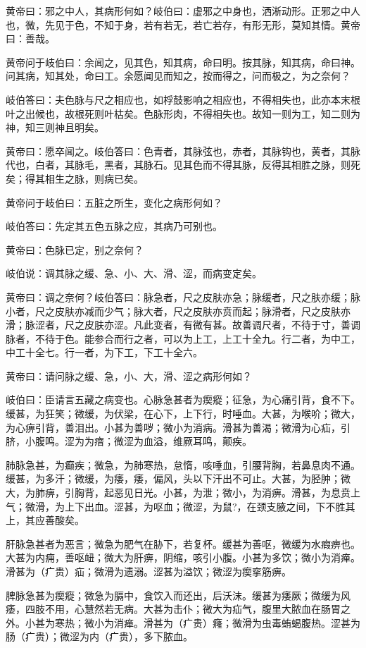 \documentclass[a4paper,12pt,UTF8,twoside]{ctexbook}
\begin{document}
	黄帝曰：邪之中人，其病形何如？岐伯曰：虚邪之中身也，洒淅动形。正邪之中人也，微，先见于色，不知于身，若有若无，若亡若存，有形无形，莫知其情。黄帝曰：善哉。
	
	黄帝问于岐伯曰：余闻之，见其色，知其病，命曰明。按其脉，知其病，命曰神。问其病，知其处，命曰工。余愿闻见而知之，按而得之，问而极之，为之奈何？
	
	岐伯答曰：夫色脉与尺之相应也，如桴鼓影响之相应也，不得相失也，此亦本末根叶之出候也，故根死则叶枯矣。色脉形肉，不得相失也。故知一则为工，知二则为神，知三则神且明矣。
	
	黄帝曰：愿卒闻之。岐伯答曰：色青者，其脉弦也，赤者，其脉钩也，黄者，其脉代也，白者，其脉毛，黑者，其脉石。见其色而不得其脉，反得其相胜之脉，则死矣；得其相生之脉，则病已矣。
	
	黄帝问于岐伯曰：五脏之所生，变化之病形何如？
	
	岐伯答曰：先定其五色五脉之应，其病乃可别也。
	
	黄帝曰：色脉已定，别之奈何？
	
	岐伯说：调其脉之缓、急、小、大、滑、涩，而病变定矣。
	
	黄帝曰：调之奈何？岐伯答曰：脉急者，尺之皮肤亦急；脉缓者，尺之肤亦缓；脉小者，尺之皮肤亦减而少气；脉大者，尺之皮肤亦贲而起；脉滑者，尺之皮肤亦滑；脉涩者，尺之皮肤亦涩。凡此变者，有微有甚。故善调尺者，不待于寸，善调脉者，不待于色。能参合而行之者，可以为上工，上工十全九。行二者，为中工，中工十全七。行一者，为下工，下工十全六。
	
	黄帝曰：请问脉之缓、急，小、大，滑、涩之病形何如？
	
	岐伯曰：臣请言五藏之病变也。心脉急甚者为瘈瘲；征急，为心痛引背，食不下。缓甚，为狂笑；微缓，为伏梁，在心下，上下行，时唾血。大甚，为喉吤；微大，为心痹引背，善泪出。小甚为善哕；微小为消病。滑甚为善渴；微滑为心疝，引脐，小腹鸣。涩为为瘖；微涩为血溢，维厥耳鸣，颠疾。
	
	肺脉急甚，为癫疾；微急，为肺寒热，怠惰，咳唾血，引腰背胸，若鼻息肉不通。缓甚，为多汗；微缓，为痿，痿，偏风，头以下汗出不可止。大甚，为胫肿；微大，为肺痹，引胸背，起恶见日光。小甚，为泄；微小，为消痹。滑甚，为息贲上气；微滑，为上下出血。涩甚，为呕血；微涩，为鼠?，在颈支腋之间，下不胜其上，其应善酸矣。
	
	肝脉急甚者为恶言；微急为肥气在胁下，若复杯。缓甚为善呕，微缓为水瘕痹也。大甚为内痈，善呕衄；微大为肝痹，阴缩，咳引小腹。小甚为多饮；微小为消瘅。滑甚为（疒贵）疝；微滑为遗溺。涩甚为溢饮；微涩为瘈挛筋痹。
	
	脾脉急甚为瘈瘲；微急为膈中，食饮入而还出，后沃沫。缓甚为痿厥；微缓为风痿，四肢不用，心慧然若无病。大甚为击仆；微大为疝气，腹里大脓血在肠胃之外。小甚为寒热；微小为消瘅。滑甚为（疒贵）癃；微滑为虫毒蛕蝎腹热。涩甚为肠（疒贵）；微涩为内（疒贵），多下脓血。
	
\end{document}
